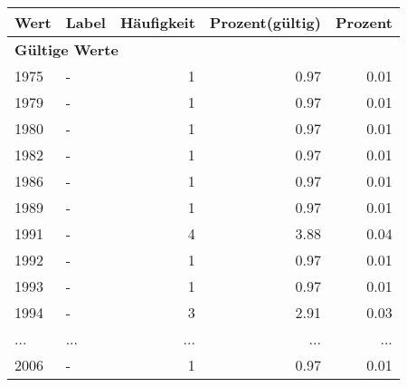      \begin{longtable}{lXrrr}
     \toprule
     \textbf{Wert} & \textbf{Label} & \textbf{Häufigkeit} & \textbf{Prozent(gültig)} & \textbf{Prozent} \\
     \endhead
     \midrule
     \multicolumn{5}{l}{\textbf{Gültige Werte}}\\
        1975 & \multicolumn{1}{X}{-} & %
          \num{1} &
          \num[round-mode=places,round-precision=2]{0,97} &
          \num[round-mode=places,round-precision=2]{0,01} \\
        1979 & \multicolumn{1}{X}{-} & %
          \num{1} &
          \num[round-mode=places,round-precision=2]{0,97} &
          \num[round-mode=places,round-precision=2]{0,01} \\
        1980 & \multicolumn{1}{X}{-} & %
          \num{1} &
          \num[round-mode=places,round-precision=2]{0,97} &
          \num[round-mode=places,round-precision=2]{0,01} \\
        1982 & \multicolumn{1}{X}{-} & %
          \num{1} &
          \num[round-mode=places,round-precision=2]{0,97} &
          \num[round-mode=places,round-precision=2]{0,01} \\
        1986 & \multicolumn{1}{X}{-} & %
          \num{1} &
          \num[round-mode=places,round-precision=2]{0,97} &
          \num[round-mode=places,round-precision=2]{0,01} \\
        1989 & \multicolumn{1}{X}{-} & %
          \num{1} &
          \num[round-mode=places,round-precision=2]{0,97} &
          \num[round-mode=places,round-precision=2]{0,01} \\
        1991 & \multicolumn{1}{X}{-} & %
          \num{4} &
          \num[round-mode=places,round-precision=2]{3,88} &
          \num[round-mode=places,round-precision=2]{0,04} \\
        1992 & \multicolumn{1}{X}{-} & %
          \num{1} &
          \num[round-mode=places,round-precision=2]{0,97} &
          \num[round-mode=places,round-precision=2]{0,01} \\
        1993 & \multicolumn{1}{X}{-} & %
          \num{1} &
          \num[round-mode=places,round-precision=2]{0,97} &
          \num[round-mode=places,round-precision=2]{0,01} \\
        1994 & \multicolumn{1}{X}{-} & %
          \num{3} &
          \num[round-mode=places,round-precision=2]{2,91} &
          \num[round-mode=places,round-precision=2]{0,03} \\
       ... & ... & ... & ... & ... \\
        2006 & \multicolumn{1}{X}{-} & %
          \num{1} &
          \num[round-mode=places,round-precision=2]{0,97} &
          \num[round-mode=places,round-precision=2]{0,01} \\


\end{longtable}

